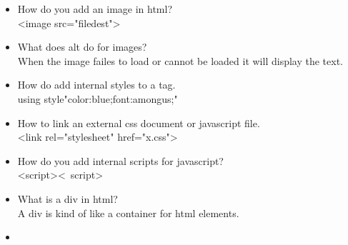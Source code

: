 \documentclass{article}
\begin{document}
\begin{itemize}
    \item How do you add an image in html?\\
    <image src="filedest">

    \item What does alt do for images?\\
    When the image failes to load or cannot be loaded it will display the text.\\

    \item How do add internal styles to a tag.\\
    using style"color:blue;font:amongus;"\\

    \item How to link an external css document or javascript file.\\
    <link rel="stylesheet" href="x.css">\\

    \item How do you add internal scripts for javascript?\\
    <script><\ script>\\

    \item What is a div in html?\\
    A div is kind of like a container for html elements.\\

    \item 
\end{itemize}
\end{document}
